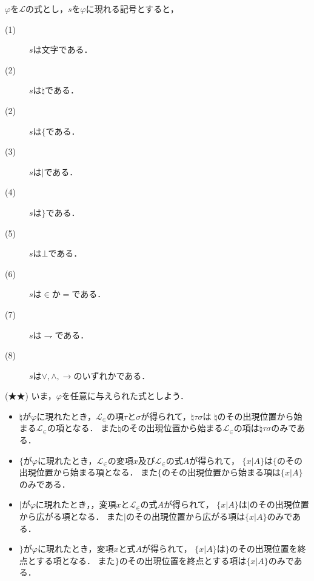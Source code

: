 	$\varphi$を$\mathcal{L}$の式とし，$s$を$\varphi$に現れる記号とすると，
	\begin{description}
		\item[(1)] $s$は文字である．
		\item[(2)] $s$は$\natural$である．
		\item[(2)] $s$は$\{$である．
		\item[(3)] $s$は$|$である．
		\item[(4)] $s$は$\}$である．
		\item[(5)] $s$は$\bot$である．
		\item[(6)] $s$は$\in$か$=$である．
		\item[(7)] $s$は$\rightharpoondown$である．
		\item[(8)] $s$は$\vee,\wedge,\rightarrow$のいずれかである．
	\end{description}
	
	\begin{screen}
		(★★) いま，$\varphi$を任意に与えられた式としよう．
		\begin{itemize}
			\item $\natural$が$\varphi$に現れたとき，$\mathcal{L}_{\in}$の項$\tau$と$\sigma$が得られて，$\natural \tau \sigma$は
				$\natural$のその出現位置から始まる$\mathcal{L}_{\in}$の項となる．
				また$\natural$のその出現位置から始まる$\mathcal{L}_{\in}$の項は$\natural \tau \sigma$のみである．
				
			\item $\{$が$\varphi$に現れたとき，$\mathcal{L}_{\in}$の変項$x$及び$\mathcal{L}_{\in}$の式$A$が得られて，
				$\{ x|A\}$は$\{$のその出現位置から始まる項となる．
				また$\{$のその出現位置から始まる項は$\{x|A\}$のみである．
				
			\item $|$が$\varphi$に現れたとき，，変項$x$と$\mathcal{L}_{\in}$の式$A$が得られて，
				$\{x|A\}$は$|$のその出現位置から広がる項となる．
				また$|$のその出現位置から広がる項は$\{x|A\}$のみである．
				
			\item $\}$が$\varphi$に現れたとき，変項$x$と式$A$が得られて，
				$\{x|A\}$は$\}$のその出現位置を終点とする項となる．
				また$\}$のその出現位置を終点とする項は$\{x|A\}$のみである．
		\end{itemize}
	\end{screen}
	
